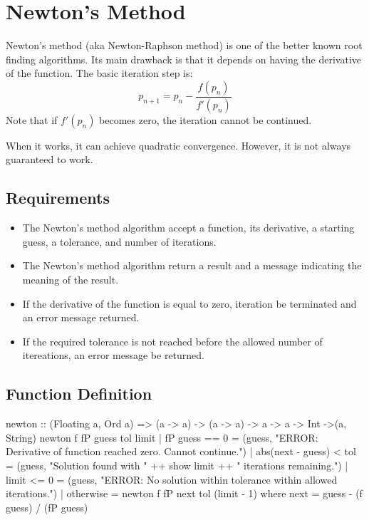 \section{Newton's Method}
Newton's method (aka Newton-Raphson method) is one of the better known root finding algorithms.  Its main drawback is that it depends on having the derivative of the function.  The basic iteration step is:
\[
p_{n+1} = p_n - \frac{f(p_n)}{f'(p_n)}
\]
Note that if $f'(p_n)$ becomes zero, the iteration cannot be continued.

When it works, it can achieve quadratic convergence.  However, it is not always guaranteed to work.
\subsection{Requirements}
\begin{itemize}
\item The Newton's method algorithm  accept a function, its derivative, a starting guess, a tolerance, and number of iterations.
\item The Newton's method algorithm  return a result and a message indicating the meaning of the result.
\item If the derivative of the function is equal to zero, iteration  be terminated and an error message returned.
\item If the required tolerance is not reached before the allowed number of itereations, an error message  be returned.
\end{itemize}

\subsection{Function Definition}
\begin{code}
newton :: (Floating a, Ord a) => (a -> a) -> (a -> a) -> a -> a -> Int ->(a, String)
newton f fP guess tol limit
  | fP guess == 0           = (guess, "ERROR: Derivative of function reached zero.  Cannot continue.")
  | abs(next - guess) < tol = (guess, "Solution found with " ++ show limit ++ " iterations remaining.")
  | limit <= 0              = (guess, "ERROR: No solution within tolerance within allowed iterations.")
  | otherwise               = newton f fP next tol (limit - 1)
  where
    next = guess - (f guess) / (fP guess)
\end{code}

